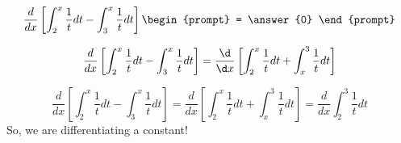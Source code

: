 \documentclass{ximera}
\author{Steven Gubkin\and Nela Lakos}
\begin{document}
\begin{exercise}

\[
\frac{d}{dx} \left[ \int_2^{x} \frac{1}{t} dt - \int_3^x \frac{1}{t} dt  \right] \begin{prompt} = \answer{0} \end{prompt}
\]
\begin{hint}
\[
\frac{d}{dx} \left[ \int_2^{x} \frac{1}{t} dt - \int_3^x \frac{1}{t} dt\right]=\frac{\d}{\d x} \left[ \int_2^{x} \frac{1}{t} dt + \int_x^3 \frac{1}{t} dt\right]
\]
\end{hint}
\begin{hint}
\[
\frac{d}{dx} \left[ \int_2^{x} \frac{1}{t} dt - \int_3^x \frac{1}{t} dt\right]=\frac{d}{dx} \left[ \int_2^{x} \frac{1}{t} dt + \int_x^3 \frac{1}{t} dt\right]=\frac{d}{dx}  \int_2^{3} \frac{1}{t} dt 
\]
So, we are differentiating a constant!
\end{hint}
\end{exercise}
\end{document}

